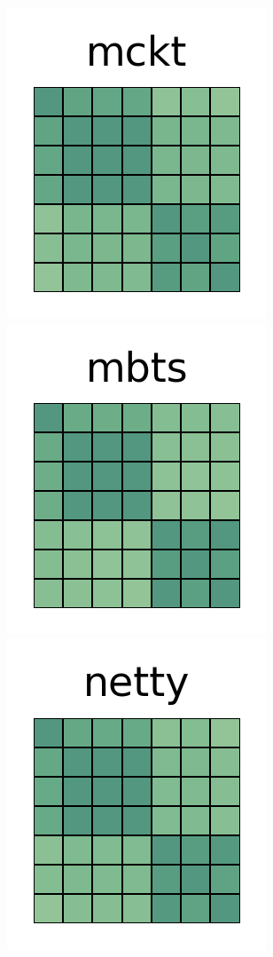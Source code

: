 \documentclass[10pt,conference]{IEEEtran}
\begin{document}
\begin{figure}[htb!]
 \includegraphics[width=\heatmapWidth, keepaspectratio]{correlations-classic/mockito-grids.png}
 \includegraphics[width=\heatmapWidth, keepaspectratio]{correlations-classic/mybatis-3-grids.png}
 \includegraphics[width=\heatmapWidth, keepaspectratio]{correlations-classic/netty-grids.png}

\end{figure}
\end{document}
